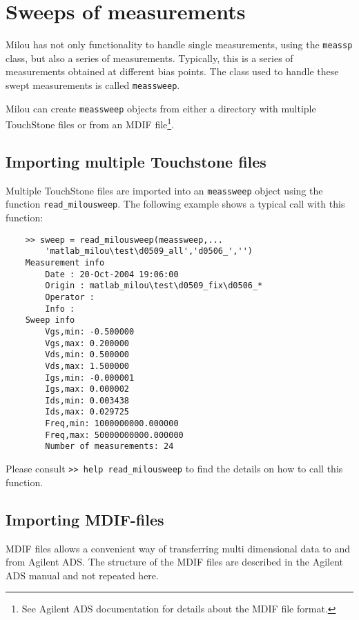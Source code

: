 %

\section{Sweeps of measurements}\label{sec:sweeps}
Milou has not only functionality to handle single measurements,
using the \verb"meassp" class, but also a series of measurements.
Typically, this is a series of measurements obtained at different
bias points. The class used to handle these swept measurements is
called \verb"meassweep".

Milou can create \verb"meassweep" objects from either a directory
with multiple TouchStone files or from an MDIF file\footnote{See
Agilent ADS documentation for details about the MDIF file
format.}.

\subsection{Importing multiple Touchstone files}
Multiple TouchStone files are imported into an \verb"meassweep"
object using the function \verb"read_milousweep". The following
example shows a typical call with this function:
\begin{small}
\begin{verbatim}
    >> sweep = read_milousweep(meassweep,...
        'matlab_milou\test\d0509_all','d0506_','')
    Measurement info
        Date : 20-Oct-2004 19:06:00
        Origin : matlab_milou\test\d0509_fix\d0506_*
        Operator :
        Info :
    Sweep info
        Vgs,min: -0.500000
        Vgs,max: 0.200000
        Vds,min: 0.500000
        Vds,max: 1.500000
        Igs,min: -0.000001
        Igs,max: 0.000002
        Ids,min: 0.003438
        Ids,max: 0.029725
        Freq,min: 1000000000.000000
        Freq,max: 50000000000.000000
        Number of measurements: 24
\end{verbatim}
\end{small}
Please consult \verb">> help read_milousweep" to find the details
on how to call this function.

\subsection{Importing MDIF-files}
MDIF files allows a convenient way of transferring multi dimensional data to and from
Agilent ADS. The structure of the MDIF files are described in the
Agilent ADS manual and not repeated here.

